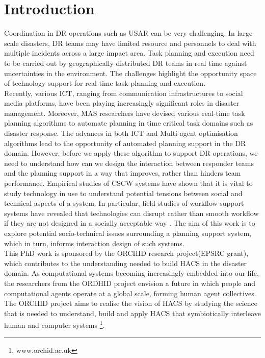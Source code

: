 \chapter{Introduction}\label{ch:introduction}
Coordination in \acf{DR} operations such as \acf{USAR} can be very challenging. In large-scale disasters, \ac{DR} teams may have limited resource and personnels to deal with multiple incidents across a large impact area. Task planning and execution need to be carried out by geographically distributed \ac{DR} teams in real time against uncertainties in the environment. The challenges highlight the opportunity space of technology support for real time task planning and execution.  \\ 

Recently, various \acf{ICT}, ranging from communication infrastructures to social media platforms, have been playing increasingly significant roles in  disaster management.  Moreover, \acf{MAS} researchers have devised various real-time task planning algorithms to automate planning in time critical task domains such as disaster response. The advances in both \ac{ICT} and Multi-agent optimisation algorithms lead to the opportunity of automated planning support in the \ac{DR} domain. However, before we apply these algorithm to support \ac{DR} operations, we need to understand how can we design the interaction between responder teams and the planning support in a way that improves, rather than hinders team performance. Empirical studies of \acf{CSCW} systems have shown that it is vital to study technology in use to understand potential tensions between social and technical aspects of a system. In particular, field studies of workflow support systems have revealed that technologies can disrupt rather than smooth workflow if they are not designed in a socially acceptable way \citep{Bowers1994}. The aim of this work is to explore potential socio-technical issues surrounding a planning support system, which in turn, informs interaction design of such systems. \\

This PhD work is sponsored by the ORCHID research project(EPSRC grant), which contributes to the understanding needed to build \acf{HACS} in the disaster domain. As computational systems  becoming increasingly embedded into our life, the researchers from the ORDHID project envision a future in which people and computational agents operate at a global scale, forming human agent collectives. The ORCHID project aims to realise the vision of \ac{HACS} by studying the science that is needed to understand, build and apply \ac{HACS} that symbiotically interleave human and computer systems \footnote{www.orchid.ac.uk}.\\

